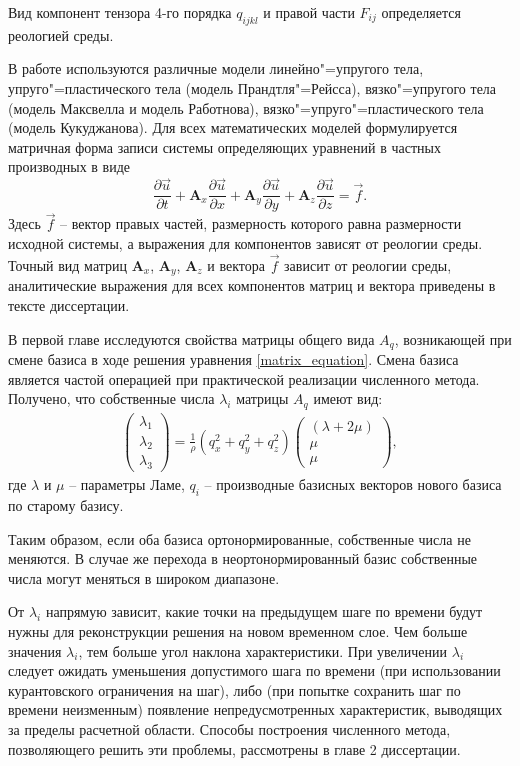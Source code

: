 Вид компонент тензора 4-го порядка $q_{ijkl}$ и правой части $F_{ij}$ определяется реологией среды.

В работе используются различные модели линейно"=упругого тела, упруго"=пластического тела (модель Прандтля"=Рейсса), вязко"=упругого тела (модель Максвелла и модель Работнова), вязко"=упруго"=пластического тела (модель Кукуджанова). Для всех математических моделей формулируется матричная форма записи системы определяющих уравнений в частных производных в виде
\begin{equation}
\label{matrix_equation}
\frac{\partial\vec{u}}{\partial{t}}+\mathbf{A}_x\frac{\partial\vec{u}}{\partial{x}}+
\mathbf{A}_y\frac{\partial\vec{u}}{\partial{y}}+
\mathbf{A}_z\frac{\partial\vec{u}}{\partial{z}}=\vec{f}.
\end{equation}
Здесь $\vec{f}$ -- вектор правых частей, размерность которого равна размерности исходной системы, а выражения для компонентов зависят от реологии среды. Точный вид матриц $\mathbf{A}_x$, $\mathbf{A}_y$, $\mathbf{A}_z$ и вектора $\vec{f}$ зависит от реологии среды, аналитические выражения для всех компонентов матриц и вектора приведены в тексте диссертации.

В первой главе исследуются свойства матрицы общего вида $A_q$, возникающей при смене базиса в ходе решения уравнения \ref{matrix_equation}. Смена базиса является частой операцией при практической реализации численного метода. Получено, что собственные числа $\lambda_i$ матрицы $A_q$ имеют вид:
\begin{align}
\left( \begin{array}{cccccccccccc}
\lambda_1 \\
\lambda_2 \\
\lambda_3 
\end{array} \right) = 
\frac 1 \rho (q_x^2 + q_y^2 + q_z^2)
\left( \begin{array}{cccccccccccc}
(\lambda+2\mu) \\
\mu \\
\mu  
\end{array} \right),
\end{align} 
где $\lambda$ и $\mu$ -- параметры Ламе, $q_i$ -- производные базисных векторов нового базиса по старому базису.

Таким образом, если оба базиса ортонормированные, собственные числа не меняются. В случае же перехода в неортонормированный базис собственные числа могут меняться в широком диапазоне.

От $\lambda_i$ напрямую зависит, какие точки на предыдущем шаге по времени будут нужны для реконструкции решения на новом временном слое. Чем больше значения $\lambda_i$, тем больше угол наклона характеристики. При увеличении $\lambda_i$ следует ожидать уменьшения допустимого шага по времени (при использовании курантовского ограничения на шаг), либо (при попытке сохранить шаг по времени неизменным) появление непредусмотренных характеристик, выводящих за пределы расчетной области. Способы построения численного метода, позволяющего решить эти проблемы, рассмотрены в главе 2 диссертации.


